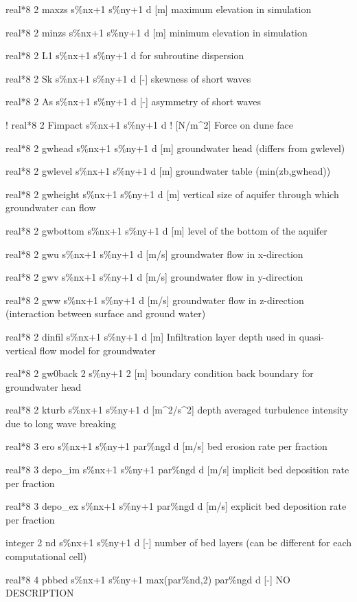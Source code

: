 real*8  2  maxzs  s\%nx+1 s\%ny+1 d  [m]        maximum elevation in simulation  

real*8  2  minzs  s\%nx+1 s\%ny+1 d  [m]        minimum elevation in simulation 

real*8  2  L1     s\%nx+1 s\%ny+1 d  for subroutine dispersion

real*8  2  Sk s\%nx+1 s\%ny+1 d  [-] skewness of short waves

real*8  2  As s\%nx+1 s\%ny+1 d  [-] asymmetry of short waves

!      real*8  2  Fimpact s\%nx+1 s\%ny+1 d ! [N/m\^{}2]    Force on dune face

real*8  2  gwhead   s\%nx+1 s\%ny+1 d  [m] groundwater head (differs from gwlevel)

real*8  2  gwlevel  s\%nx+1 s\%ny+1 d  [m] groundwater table (min(zb,gwhead))

real*8  2  gwheight s\%nx+1 s\%ny+1 d  [m] vertical size of aquifer through which groundwater can flow

real*8  2  gwbottom s\%nx+1 s\%ny+1 d  [m] level of the bottom of the aquifer

real*8  2  gwu      s\%nx+1 s\%ny+1 d  [m/s] groundwater flow in x-direction

real*8  2  gwv      s\%nx+1 s\%ny+1 d  [m/s] groundwater flow in y-direction

real*8  2  gww      s\%nx+1 s\%ny+1 d  [m/s] groundwater flow in z-direction (interaction between surface and ground water)

real*8  2  dinfil   s\%nx+1 s\%ny+1 d  [m] Infiltration layer depth used in quasi-vertical flow model for groundwater

real*8  2  gw0back  2      s\%ny+1 2  [m] boundary condition back boundary for groundwater head

real*8  2  kturb    s\%nx+1 s\%ny+1 d  [m\^{}2/s\^{}2]  depth averaged turbulence intensity due to long wave breaking

real*8  3  ero      s\%nx+1 s\%ny+1 par\%ngd d  [m/s] bed erosion rate per fraction

real*8  3  depo\_im     s\%nx+1 s\%ny+1 par\%ngd d  [m/s] implicit bed deposition rate per fraction

real*8  3  depo\_ex     s\%nx+1 s\%ny+1 par\%ngd d  [m/s] explicit bed deposition rate per fraction

integer 2  nd       s\%nx+1 s\%ny+1 d  [-]  number of bed layers (can be different for each computational cell)

real*8  4  pbbed    s\%nx+1 s\%ny+1 max(par\%nd,2) par\%ngd d [-] NO DESCRIPTION

